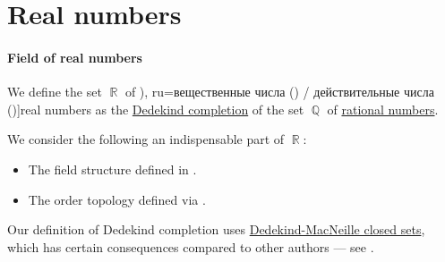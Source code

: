 \section{Real numbers}\label{sec:real_numbers}

\paragraph{Field of real numbers}

\begin{definition}\label{def:real_numbers}
  We define the set \( \BbbR \) of \term[bg=реални числа (\cite[ch. I]{Тагамлицки1971Диф}), ru=вещественные числа (\cite[\S 3]{Фихтенгольц1968ОсновыТом1}) / действительные числа (\cite[def. 25.1]{АлександровМаркушевичХинчин1951ЭнциклопедияТом1})]{real numbers} as the \hyperref[def:dedekind_completion]{Dedekind completion} of the set \( \BbbQ \) of \hyperref[def:rational_numbers]{rational numbers}.
\end{definition}
\begin{comments}
  \item We consider the following an indispensable part of \( \BbbR \):
  \begin{itemize}
    \item The field structure defined in .
    \item The order topology defined via .
  \end{itemize}

  \item Our definition of Dedekind completion uses \hyperref[def:dedekind_macnielle_closure]{Dedekind-MacNeille closed sets}, which has certain consequences compared to other authors --- see .
\end{comments}


